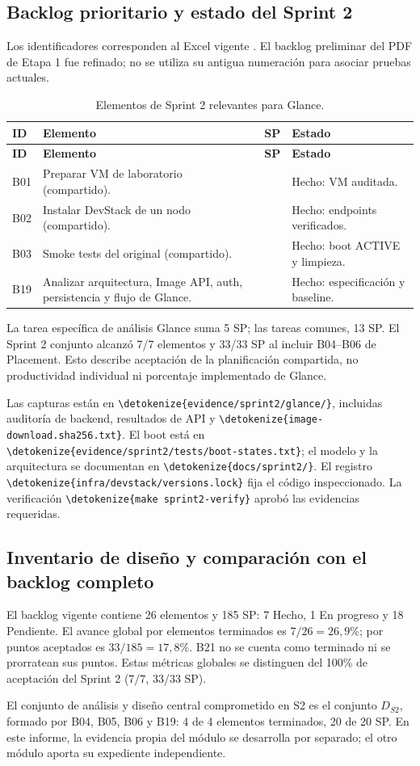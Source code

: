 \documentclass[12pt,a4paper]{article}
\newcommand{\code}[1]{{\small\expandafter\nolinkurl\expandafter{\detokenize{#1}}}}
\newcommand{\reporttable}[4]{\begingroup\small\setlength{\LTpre}{8pt}\setlength{\LTpost}{8pt}\setlength{\tabcolsep}{4pt}\renewcommand{\arraystretch}{1.15}
\begin{longtable}{#2}\caption{#1}\\\toprule #3\\\midrule\endfirsthead
\toprule #3\\\midrule\endhead\bottomrule\endfoot #4\end{longtable}\endgroup}
\begin{document}
\subsection{Backlog prioritario y estado del Sprint 2}
Los identificadores corresponden al Excel vigente \cite{plan}. El backlog preliminar del PDF de Etapa 1 fue refinado; no se utiliza su antigua numeración para asociar pruebas actuales.
\reporttable{Elementos de Sprint 2 relevantes para Glance.}{>{\raggedright\arraybackslash}p{1cm}>{\raggedright\arraybackslash}p{8.1cm}>{\raggedright\arraybackslash}p{1.2cm}>{\raggedright\arraybackslash}p{4.5cm}}{\textbf{ID}&\textbf{Elemento}&\textbf{SP}&\textbf{Estado}}{
B01&Preparar VM de laboratorio (compartido).&3&Hecho: VM auditada.\\*
B02&Instalar DevStack de un nodo (compartido).&5&Hecho: endpoints verificados.\\*
B03&Smoke tests del original (compartido).&5&Hecho: boot ACTIVE y limpieza.\\*
B19&Analizar arquitectura, Image API, auth, persistencia y flujo de Glance.&5&Hecho: especificación y baseline.\\}
La tarea específica de análisis Glance suma 5 SP; las tareas comunes, 13 SP. El Sprint 2 conjunto alcanzó 7/7 elementos y 33/33 SP al incluir B04--B06 de Placement. Esto describe aceptación de la planificación compartida, no productividad individual ni porcentaje implementado de Glance.

Las capturas están en \code{evidence/sprint2/glance/}, incluidas auditoría de backend, resultados de API y \code{image-download.sha256.txt}. El boot está en \code{evidence/sprint2/tests/boot-states.txt}; el modelo y la arquitectura se documentan en \code{docs/sprint2/}. El registro \code{infra/devstack/versions.lock} fija el código inspeccionado. La verificación \code{make sprint2-verify} aprobó las evidencias requeridas.

\subsection{Inventario de diseño y comparación con el backlog completo}
El backlog vigente contiene 26 elementos y 185 SP: 7 Hecho, 1 En progreso y 18 Pendiente. El avance global por elementos terminados es $7/26=26{,}9\%$; por puntos aceptados es $33/185=17{,}8\%$. B21 no se cuenta como terminado ni se prorratean sus puntos. Estas métricas globales se distinguen del 100\% de aceptación del Sprint 2 ($7/7$, 33/33 SP).

El conjunto de análisis y diseño central comprometido en S2 es el conjunto $D_{S2}$, formado por B04, B05, B06 y B19: 4 de 4 elementos terminados, 20 de 20 SP. En este informe, la evidencia propia del módulo se desarrolla por separado; el otro módulo aporta su expediente independiente.
\end{document}
